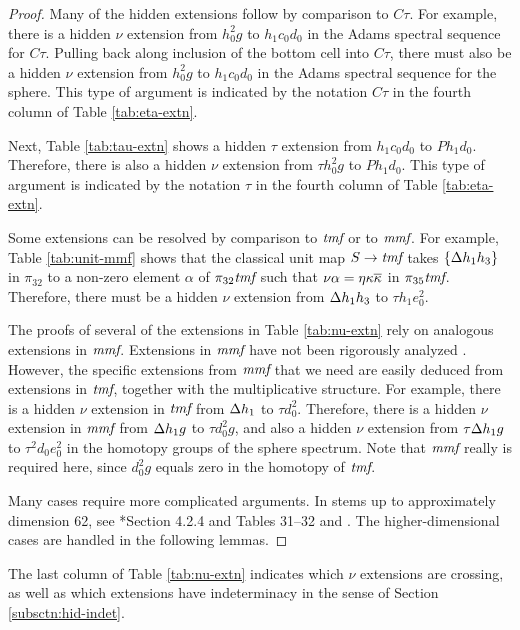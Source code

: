 \begin{proof}
Many of the hidden extensions follow by comparison to 
$C\tau$.  For example, there is a hidden $\nu$ extension
from $ h_0^2 g$ to $h_1 c_0 d_0$ in the Adams spectral
sequence for $C\tau$.
Pulling back along inclusion of the bottom cell into $C\tau$,
there must also be a hidden $\nu$ extension from $h_0^2 g$
to $h_1 c_0 d_0$ in the Adams spectral sequence for the sphere.
This type of argument is indicated by the notation
$C\tau$ in the fourth column of Table \ref{tab:eta-extn}.

Next, Table \ref{tab:tau-extn} shows a hidden $\tau$
extension from $h_1 c_0 d_0$ to $P h_1 d_0$.
Therefore, there is also a hidden $\nu$ extension from
$\tau h_0^2 g$ to $P h_1 d_0$.
This type of argument is indicated by the notation $\tau$
in the fourth column of Table \ref{tab:eta-extn}.

Some extensions can be resolved by comparison to
$\textit{tmf}$ or to $\textit{mmf}$.
For example,
Table \ref{tab:unit-mmf} shows that 
the classical unit map $S \rightarrow \textit{tmf}$
takes $\{\Delta h_1 h_3\}$ in $\pi_{32}$ to a non-zero element
$\alpha$ of $\pi_{32} \textit{tmf}$ 
such that $\nu \alpha = \eta \kappa \overline{\kappa}$
in $\pi_{35} \textit{tmf}$.
Therefore, there must be a hidden $\nu$ extension
from $\Delta h_1 h_3$ to $\tau h_1 e_0^2$.

The proofs of several of the extensions in Table \ref{tab:nu-extn}
rely on analogous extensions in $\textit{mmf}$.  
Extensions in $\textit{mmf}$ have not been rigorously analyzed \cite{Isaksen18}.
However, the specific extensions from $\textit{mmf}$ that we need
are easily deduced from extensions in $\textit{tmf}$, together
with the multiplicative structure.
For example, there is a hidden $\nu$ extension in $\textit{tmf}$
from $\Delta h_1$ to $\tau d_0^2$.
Therefore, there is a hidden $\nu$ extension in $\textit{mmf}$
from $\Delta h_1 g$ to $\tau d_0^2 g$, and also a hidden
$\nu$ extension from $\tau \Delta h_1 g$ to $\tau^2 d_0 e_0^2$
in the homotopy groups of the sphere spectrum.
Note that $\textit{mmf}$ really is required here, since $d_0^2 g$ equals
zero in the homotopy of $\textit{tmf}$.

Many cases require more complicated arguments.  In stems up to
approximately dimension 62, see 
\cite{Isaksen14c}*{Section 4.2.4 and Tables 31--32} and
\cite{WangXu18}.
The higher-dimensional cases are handled in the following lemmas.
\end{proof}

\begin{remark}
\label{rem:nu-extn-notes}
The last column of Table \ref{tab:nu-extn} indicates which
$\nu$ extensions are crossing, as well as which extensions
have indeterminacy in the sense of Section \ref{subsctn:hid-indet}.
\end{remark}

